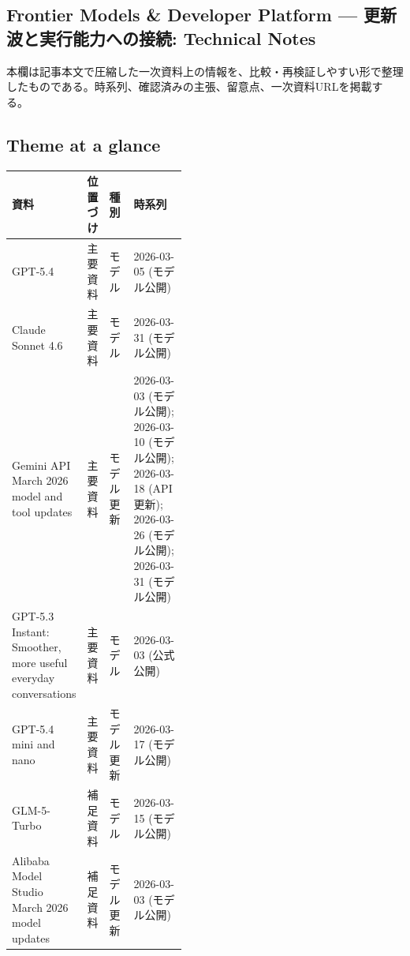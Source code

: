 \subsection*{Frontier Models \& Developer Platform — 更新波と実行能力への接続: Technical Notes}
本欄は記事本文で圧縮した一次資料上の情報を、比較・再検証しやすい形で整理したものである。時系列、確認済みの主張、留意点、一次資料URLを掲載する。
\medskip
\subsection*{Theme at a glance}
\begin{center}
\footnotesize
\begin{tabularx}{\linewidth}{@{}p{0.20\linewidth}p{0.10\linewidth}p{0.14\linewidth}X@{}}
\toprule
資料 & 位置づけ & 種別 & 時系列 \\
\midrule
GPT-5.4 & 主要資料 & モデル & 2026-03-05 (モデル公開) \\
Claude Sonnet 4.6 & 主要資料 & モデル & 2026-03-31 (モデル公開) \\
Gemini API March 2026 model and tool updates & 主要資料 & モデル更新 & 2026-03-03 (モデル公開); 2026-03-10 (モデル公開); 2026-03-18 (API更新); 2026-03-26 (モデル公開); 2026-03-31 (モデル公開) \\
GPT-5.3 Instant: Smoother, more useful everyday conversations & 主要資料 & モデル & 2026-03-03 (公式公開) \\
GPT-5.4 mini and nano & 主要資料 & モデル更新 & 2026-03-17 (モデル公開) \\
GLM-5-Turbo & 補足資料 & モデル & 2026-03-15 (モデル公開) \\
Alibaba Model Studio March 2026 model updates & 補足資料 & モデル更新 & 2026-03-03 (モデル公開) \\
\bottomrule
\end{tabularx}
\end{center}
\normalsize

